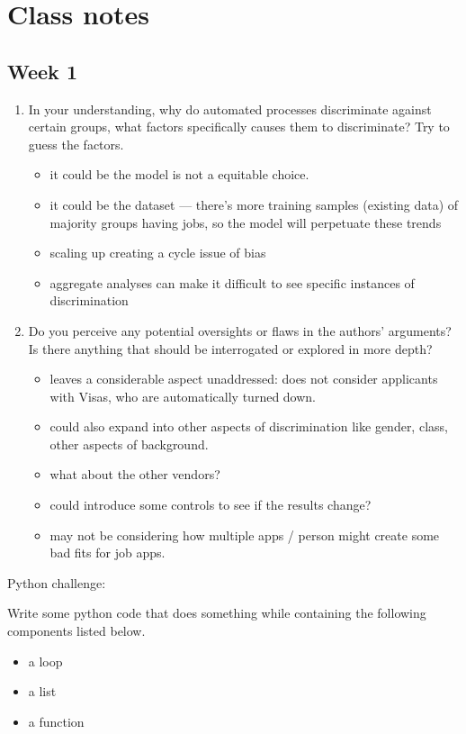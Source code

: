\documentclass[11pt]{article}
\author{fcalado}
\date{\today}
\title{}
\begin{document}
\tableofcontents

\section{Class notes}
\label{sec:orgaa5d2ae}

\subsection{Week 1}
\label{sec:org5e42edd}

\begin{enumerate}
\item In your understanding, why do automated processes discriminate
against certain groups, what factors specifically causes them to
discriminate? Try to guess the factors.
\begin{itemize}
\item it could be the model is not a equitable choice.
\item it could be the dataset — there’s more training samples (existing
data) of majority groups having jobs, so the model will
perpetuate these trends
\item scaling up creating a cycle issue of bias
\item aggregate analyses can make it difficult to see specific
instances of discrimination
\end{itemize}

\item Do you perceive any potential oversights or flaws in the authors’
arguments? Is there anything that should be interrogated or
explored in more depth?
\begin{itemize}
\item leaves a considerable aspect unaddressed: does not consider
applicants with Visas, who are automatically turned down.
\item could also expand into other aspects of discrimination like
gender, class, other aspects of background.
\item what about the other vendors?
\item could introduce some controls to see if the results change?
\item may not be considering how multiple apps / person might create
some bad fits for job apps.
\end{itemize}
\end{enumerate}

Python challenge:

Write some python code that does something while containing the
following components listed below.
\begin{itemize}
\item a loop
\item a list
\item a function
\end{itemize}
\end{document}
